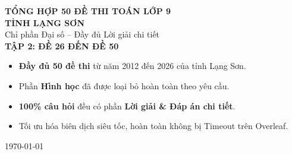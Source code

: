 \documentclass[12pt,a4paper]{article}
\begin{document}
\begin{titlepage}
  \centering\vspace*{2.0cm}
  \begin{tcolorbox}[
    colback=titlebg, colframe=titlebg!80!black,
    arc=10pt, boxrule=2pt,
    width=\textwidth,
    halign=center,
    top=24pt, bottom=24pt
  ]
    {\color{white}\fontsize{24}{30}\selectfont\bfseries
      TỔNG HỢP 50 ĐỀ THI TOÁN LỚP 9}\\[10pt]
    {\color{white}\Large\bfseries TỈNH LẠNG SƠN}\\[16pt]
    {\color{white}\large Chỉ phần Đại số -- Đầy đủ Lời giải chi tiết}\\[8pt]{\color{white}\large\bfseries TẬP 2: ĐỀ 26 ĐẾN ĐỀ 50}
  \end{tcolorbox}

  \vspace{1.0cm}
  \begin{tcolorbox}[colback=warnbg,colframe=warnborder,arc=5pt,
    boxrule=0.6pt,width=0.9\textwidth,halign=left]
    \begin{itemize}[leftmargin=1.5em]
      \item \textbf{Đầy đủ 50 đề thi} từ năm 2012 đến 2026 của tỉnh Lạng Sơn.
      \item Phần \textbf{Hình học} đã được loại bỏ hoàn toàn theo yêu cầu.
      \item \textbf{100\% câu hỏi} đều có phần \textbf{Lời giải \& Đáp án chi tiết}.
      \item Tối ưu hóa biên dịch siêu tốc, hoàn toàn không bị Timeout trên Overleaf.
    \end{itemize}
  \end{tcolorbox}

  \vfill
  {\small\color{gray}\today}
\end{titlepage}

\tableofcontents
\clearpage

\clearpage

\clearpage

\clearpage

\clearpage

\clearpage

\clearpage

\clearpage

\clearpage

\clearpage

\clearpage

\clearpage

\clearpage

\clearpage

\clearpage

\clearpage

\clearpage

\clearpage

\clearpage

\clearpage

\clearpage

\clearpage

\clearpage

\clearpage

\clearpage

\clearpage
\end{document}
